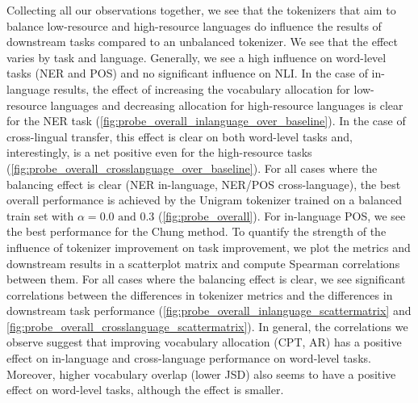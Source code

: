 Collecting all our observations together, we see that the tokenizers that aim to balance low-resource and high-resource languages do influence the results of downstream tasks compared to an unbalanced tokenizer. We see that the effect varies by task and language. Generally, we see a high influence on word-level tasks (NER and POS) and no significant influence on NLI. In the case of in-language results, the effect of increasing the vocabulary allocation for low-resource languages and decreasing allocation for high-resource languages is clear for the NER task (\autoref{fig:probe_overall_inlanguage_over_baseline}). In the case of cross-lingual transfer, this effect is clear on both word-level tasks and, interestingly, is a net positive even for the high-resource tasks (\autoref{fig:probe_overall_crosslanguage_over_baseline}). For all cases where the balancing effect is clear (NER in-language, NER/POS cross-language), the best overall performance is achieved by the Unigram tokenizer trained on a balanced train set with $\alpha=0.0\text{ and }0.3$ (\autoref{fig:probe_overall}). For in-language POS, we see the best performance for the Chung method. To quantify the strength of the influence of tokenizer improvement on task improvement, we plot the metrics and downstream results in a scatterplot matrix and compute Spearman correlations between them. For all cases where the balancing effect is clear, we see significant correlations between the differences in tokenizer metrics and the differences in downstream task performance (\autoref{fig:probe_overall_inlanguage_scattermatrix} and \autoref{fig:probe_overall_crosslanguage_scattermatrix}). In general, the correlations we observe suggest that improving vocabulary allocation (CPT, AR) has a positive effect on in-language and cross-language performance on word-level tasks. Moreover, higher vocabulary overlap (lower JSD) also seems to have a positive effect on word-level tasks, although the effect is smaller. 

